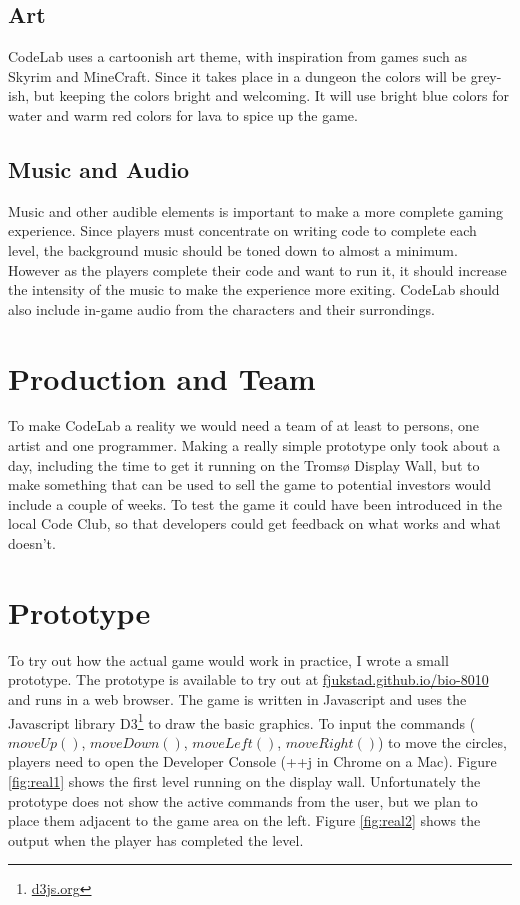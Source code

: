 \documentclass[12pt,journal,compsoc, a4paper, onecolumn]{IEEEtran}
\begin{document}
\subsection{Art} 
CodeLab uses a cartoonish art theme, with inspiration from games such as Skyrim
and MineCraft. Since it takes place in a dungeon the colors will be grey-ish,
but keeping the colors bright and welcoming. It will use bright blue colors for
water and warm red colors for lava to spice up the game. 

\subsection{Music and Audio}
Music and other audible elements is important to make a more complete gaming
experience. Since players must concentrate on writing code to complete each
level, the background music should be toned down to almost a minimum. However as
the players complete their code and want to run it, it should increase the
intensity of the music to make the experience more exiting. CodeLab should also
include in-game audio from the characters and their surrondings. 

\section{Production and Team} 
To make CodeLab a reality we would need a team of at least to persons, one
artist and one programmer. Making a really simple prototype only took about a
day, including the time to get it running on the Troms{\o} Display Wall, but to
make something that can be used to sell the game to potential investors would
include a couple of weeks. To test the game it could have been introduced in the
local Code Club, so that developers could get feedback on what works and what
doesn't.  

\section{Prototype} 

To try out how the actual game would work in practice, I wrote a small
prototype. The prototype is available to try out at
\url{fjukstad.github.io/bio-8010} and runs in a web browser. The game is written
in Javascript and uses the Javascript library D3\footnote{\url{d3js.org}} to
draw the basic graphics. To input the commands ($moveUp()$, $moveDown()$,
$moveLeft()$, $moveRight()$) to move the circles, players
need to open the Developer Console (\cmdkey+\optkey+j in Chrome on a Mac).
Figure \ref{fig:real1} shows the first level running on the display wall.
Unfortunately the prototype does not show the active commands from the user, but
we plan to place them adjacent to the game area on the left. Figure
\ref{fig:real2} shows the output when the player has completed the level. 
\end{document}
